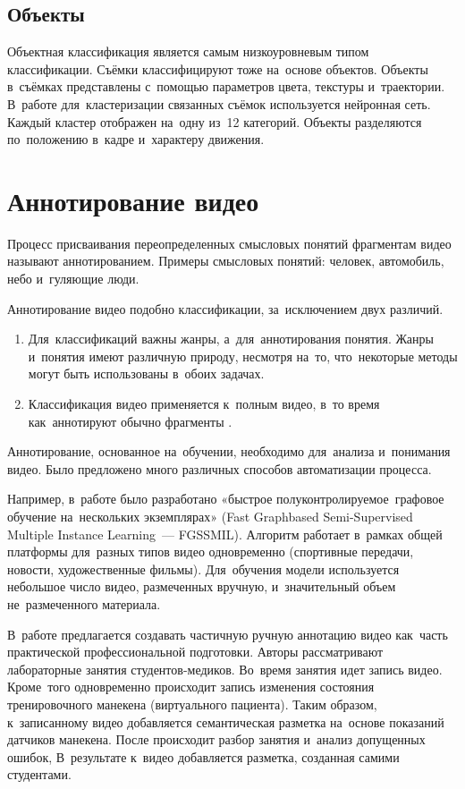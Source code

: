 \subsection{Объекты}

Объектная классификация является самым низкоуровневым типом классификации.
Съёмки классифицируют тоже на~основе объектов.
Объекты в~съёмках представлены с~помощью параметров цвета, текстуры и~траектории.
В~работе \cite{Hong:2005} для~кластеризации связанных съёмок
используется нейронная сеть.
Каждый кластер отображен на~одну из~12 категорий.
Объекты разделяются по~положению в~кадре и~характеру движения.


\section{Аннотирование видео}

Процесс присваивания переопределенных смысловых понятий фрагментам видео
называют аннотированием. Примеры смысловых понятий: человек,
автомобиль, небо и~гуляющие люди.

Аннотирование видео подобно классификации, за~исключением двух различий.
\begin{enumerate}
    \item Для~классификаций важны жанры, а~для~аннотирования понятия.
        Жанры и~понятия имеют различную природу, несмотря на~то,
        что~некоторые методы могут быть использованы в~обоих задачах.
    \item Классификация видео применяется к~полным видео,
        в~то время как~аннотируют обычно фрагменты \cite{Yang:2007}.
\end{enumerate}

Аннотирование, основанное на~обучении, необходимо для~анализа
и~понимания видео. Было предложено много различных способов
автоматизации процесса.

Например, в~работе \cite{Zhang:2012} было
разработано «быстрое полуконтролируемое\
графовое обучение на~нескольких экземплярах»
(Fast Graphbased Semi-Supervised Multiple Instance Learning~— FGSSMIL).
Алгоритм работает в~рамках общей платформы для~разных типов видео одновременно
(спортивные передачи, новости, художественные фильмы).
Для~обучения модели используется небольшое число видео, размеченных вручную,
и~значительный объем не~размеченного материала.

В~работе \cite{Weal:2012} предлагается создавать
частичную ручную аннотацию видео
как~часть практической профессиональной подготовки.
Авторы рассматривают лабораторные занятия студентов-медиков.
Во~время занятия идет запись видео.
Кроме~того одновременно происходит запись изменения состояния
тренировочного манекена (виртуального пациента).
Таким образом, к~записанному видео добавляется семантическая разметка
на~основе показаний датчиков манекена.
После происходит разбор занятия и~анализ допущенных ошибок,
В~результате к~видео добавляется разметка, созданная самими студентами.


